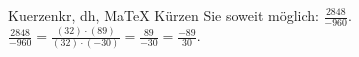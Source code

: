 \begin{MAufgabe}{Kuerzen}{kr, dh, MaTeX}
K\"urzen Sie soweit m\"oglich: $\frac{2848}{-960}$.\\ 
\ifLsg\MLoesung
\quad $\frac{2848}{-960}=\frac{(32)\cdot(89)}{(32)\cdot(-30)}=\frac{89}{-30}=\frac{-89}{30}$.\else\relax\fi
 \end{MAufgabe}